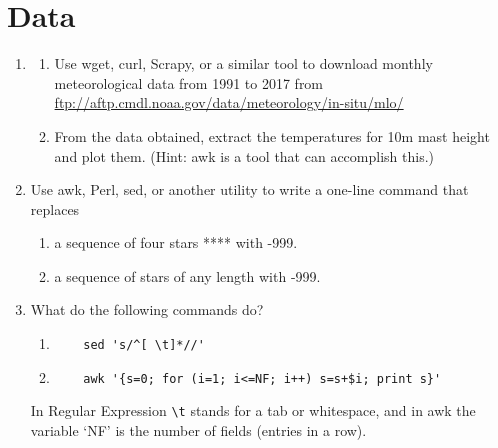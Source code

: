 \documentclass{article}
\begin{document}
\section{Data}
\begin{enumerate}
  
\item \label{exrc:wgetmlo} 
  \begin{enumerate}\setlength{\itemsep}{0pt}
  \item Use wget, curl, Scrapy, or a similar tool to download monthly meteorological data from 1991 to 2017 from \url{ftp://aftp.cmdl.noaa.gov/data/meteorology/in-situ/mlo/}
 
  \item From the data obtained, extract the temperatures for 10m mast height and plot them.
    (Hint: awk is a tool that can accomplish this.)
  \end{enumerate}


\item Use awk, Perl, sed, or another utility to write a one-line command that replaces
  \begin{enumerate}\setlength{\itemsep}{0pt}
  \item a sequence of four stars **** with -999.
  \item a sequence of stars of any length with -999.
  \end{enumerate}


\item What do the following commands do?
  \begin{enumerate}\setlength{\itemsep}{0pt}
  \item
\begin{verbatim}
    sed 's/^[ \t]*//' 
\end{verbatim}
  \item
\begin{verbatim}
    awk '{s=0; for (i=1; i<=NF; i++) s=s+$i; print s}'
\end{verbatim}
\end{enumerate}
In Regular Expression \verb+\t+ stands for a tab or whitespace,
and in awk the variable `NF' is the number of fields (entries in a row).


\end{enumerate}
\end{document}
